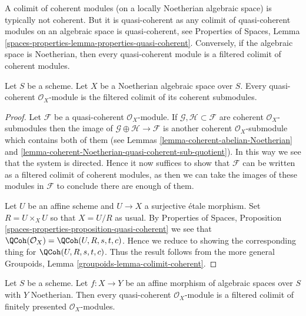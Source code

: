 \noindent
A colimit of coherent modules (on a locally Noetherian
algebraic space) is typically not coherent. But it is quasi-coherent
as any colimit of quasi-coherent modules on an algebraic space is
quasi-coherent, see Properties of Spaces, Lemma
\ref{spaces-properties-lemma-properties-quasi-coherent}.
Conversely, if the algebraic space is Noetherian, then every quasi-coherent
module is a filtered colimit of coherent modules.

\begin{lemma}
\label{lemma-directed-colimit-coherent}
Let $S$ be a scheme. Let $X$ be a Noetherian algebraic space over $S$.
Every quasi-coherent $\mathcal{O}_X$-module is the filtered colimit
of its coherent submodules.
\end{lemma}

\begin{proof}
Let $\mathcal{F}$ be a quasi-coherent $\mathcal{O}_X$-module.
If $\mathcal{G}, \mathcal{H} \subset \mathcal{F}$ are coherent
$\mathcal{O}_X$-submodules then the image of
$\mathcal{G} \oplus \mathcal{H} \to \mathcal{F}$ is another
coherent $\mathcal{O}_X$-submodule which contains both of them
(see Lemmas \ref{lemma-coherent-abelian-Noetherian} and
\ref{lemma-coherent-Noetherian-quasi-coherent-sub-quotient}).
In this way we see that the system is directed.
Hence it now suffices to show that $\mathcal{F}$ can be written as
a filtered colimit of coherent modules, as then we can take the
images of these modules in $\mathcal{F}$ to conclude there are
enough of them.

\medskip\noindent
Let $U$ be an affine scheme and $U \to X$ a surjective \'etale morphism.
Set $R = U \times_X U$ so that $X = U/R$ as usual. By
Properties of Spaces, Proposition
\ref{spaces-properties-proposition-quasi-coherent}
we see that $\QCoh(\mathcal{O}_X) = \QCoh(U, R, s, t, c)$.
Hence we reduce to showing the corresponding thing for
$\QCoh(U, R, s, t, c)$. Thus the result follows from
the more general Groupoids, Lemma \ref{groupoids-lemma-colimit-coherent}.
\end{proof}

\begin{lemma}
\label{lemma-direct-colimit-finite-presentation}
Let $S$ be a scheme. Let $f : X \to Y$ be an affine morphism of algebraic
spaces over $S$ with $Y$ Noetherian. Then every quasi-coherent
$\mathcal{O}_X$-module is a filtered colimit of finitely presented
$\mathcal{O}_X$-modules.
\end{lemma}

